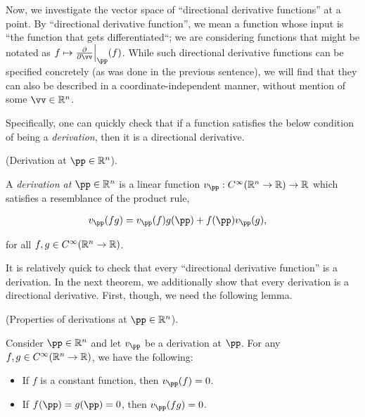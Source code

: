 \begin{comment}
    \begin{theorem}
        (Basis for $T_\pp(\R^n)$). For any $\pp \in \R^n$, the derivations $\Big\{ \frac{\pd}{\pd x^i}\Big|_\pp \Big\}_{i = 1}^n$ at $\pp \in \R^n$, where $\Big( \frac{\pd}{\pd x^i}\Big) \Big|_\pp (f) = \frac{\pd f}{\pd x^i}\Big|_\pp$, are a basis for $T_\pp(\R^n)$.
    \end{theorem}
\end{comment}

Now, we investigate the vector space of ``directional derivative functions'' at a point. By ``directional derivative function'', we mean a function whose input is ``the function that gets differentiated``; we are considering functions that might be notated as $f \mapsto \frac{\pd}{\pd \vv}\Big|_\pp (f)$. While such directional derivative functions can be specified concretely (as was done in the previous sentence), we will find that they can also be described in a coordinate-independent manner, without mention of some $\vv \in \R^n$. 

Specifically, one can quickly check that if a function satisfies the below condition of being a \textit{derivation}, then it is a directional derivative. 

\begin{defn}
     (Derivation at $\pp \in \R^n$).
    
    A \textit{derivation at $\pp \in \R^n$} is a linear function $v_\pp:C^\infty(\R^n \rightarrow \R) \rightarrow \R$ which satisfies a resemblance of the product rule,
    
    \begin{align*}
        v_\pp(fg) &= v_\pp(f)g(\pp) + f(\pp)v_\pp(g),
    \end{align*}
    
    for all $f, g \in C^\infty(\mathbb{R}^n \rightarrow \mathbb{R})$.
\end{defn}

It is relatively quick to check that every ``directional derivative function'' is a derivation. In the next theorem, we additionally show that every derivation is a directional derivative. First, though, we need the following lemma.

\begin{lemma}
\label{ch::manifolds::lemma::properties_of_derivations_Rn}
     (Properties of derivations at $\pp \in \R^n$). 
    
    Consider $\pp \in \R^n$ and let $v_\pp$ be a derivation at $\pp$. For any $f, g \in C^\infty(\mathbb{R}^n \rightarrow \mathbb{R})$, we have the following:
    
    \begin{itemize}
        \item If $f$ is a constant function, then $v_\pp(f) = 0$.
        \item If $f(\pp) = g(\pp) = 0$, then $v_\pp(fg) = 0$.
    \end{itemize}
\end{lemma}


